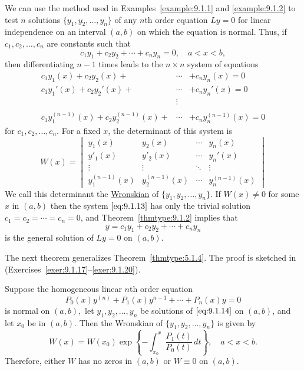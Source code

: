 \documentclass{ximera}
\begin{document}
We can use the method used in Examples~\ref{example:9.1.1} and
\ref{example:9.1.2} to test $n$ solutions $\{y_1,y_2,\dots,y_n\}$ of any
$n$th order equation $Ly=0$ for linear independence on an interval
$(a,b)$ on which the equation is normal. Thus, if $c_1, c_2 ,\dots, c_n$ are constants such that
$$
c_1y_1+c_2y_2+\cdots+c_ny_n=0,\quad a<x<b,
$$
then differentiating $n-1$ times leads to the $n\times n$
system of equations
\begin{equation} \label{eq:9.1.13}
\begin{array}{rcl}
c_1y_1(x)+c_2y_2(x)+&\cdots&+c_ny_n(x)=0\\
c_1y_1'(x)+c_2y_2'(x)+&\cdots&+c_ny_n'(x)=0\\
&\vdots&\\
&&\\
c_1y_1^{(n-1)}(x)+c_2y_2^{(n-1)}(x)+&\cdots&+c_ny_n^{(n-1)}(x)
=0
\end{array}
\end{equation}
for $c_1, c_2, \dots, c_n$. For a fixed $x$,  the determinant of this
system is
$$
W(x)=\begin{vmatrix}
y_1(x)&y_2(x)&\cdots&y_n(x)\\
y'_1(x)&y'_2(x)&\cdots&y_n'(x)\\
\vdots&\vdots&\ddots&\vdots\\
y_1^{(n-1)}(x)&y_2^{(n-1)}(x)&\cdots&y_n^{(n-1)}(x)
\end{vmatrix}
$$
We call this determinant the
\href{https://en.wikipedia.org/wiki/Wronskian}{Wronskian} of
$\{y_1,y_2,\dots,y_n\}$. If $W(x)\neq 0$ for some $x$ in $(a,b)$ then
 the system $\eqref{eq:9.1.13}$ has only the trivial solution
$c_1=c_2=\cdots=c_n=0$, and Theorem~\ref{thmtype:9.1.2} implies that
$$
y=c_1y_1+c_2y_2+\cdots+c_ny_n
$$
is the general solution of $Ly=0$ on $(a,b)$.


The next theorem generalizes Theorem~\ref{thmtype:5.1.4}.  The proof is sketched in (Exercises~\ref{exer:9.1.17}--\ref{exer:9.1.20}).

\begin{theorem}\label{thmtype:9.1.3}
 Suppose the   homogeneous linear $n$th order equation
\begin{equation}\label{eq:9.1.14}
P_0(x)y^{(n)}+P_1(x)y^{n-1}+\cdots+P_n(x)y=0
\end{equation}
is normal on $(a,b),$ let $y_1, y_2, \dots, y_n$ be solutions of
$\eqref{eq:9.1.14}$ on $(a,b)$, and let $x_0$ be in $(a,b)$. Then the Wronskian of $\{y_1,y_2,\dots,y_n\}$ is given by
\begin{equation}  \label{eq:9.1.15}
W(x)=W(x_0)\exp\left\{-\int^x_{x_0}\frac{P_1(t)}{P_0(t)}\,
dt\right\},\quad a<x<b.
\end{equation}
Therefore,  either $W$ has no zeros in  $(a,b)$ or $W\equiv0$
on  $(a,b)$.
\end{theorem}
\end{document}
